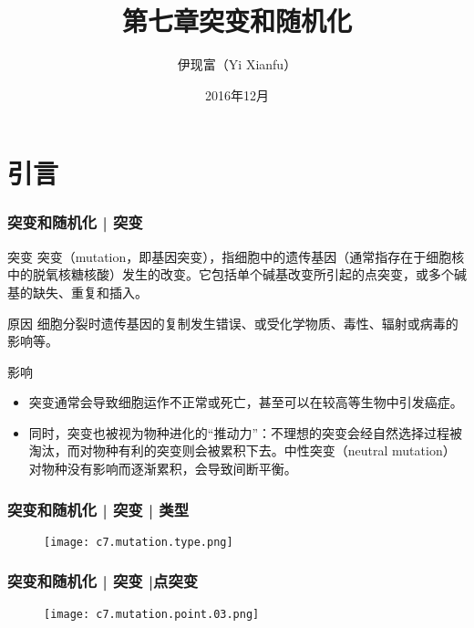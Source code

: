 


\title[突变和随机化]{第七章\quad 突变和随机化}
\author[Yixf]{伊现富（Yi Xianfu）}
\date{2016年12月}





\section{引言}
\begin{frame}
  \frametitle{突变和随机化 | 突变}
  \begin{block}{突变}
 突变（mutation，即基因突变），指细胞中的遗传基因（通常指存在于细胞核中的脱氧核糖核酸）发生的改变。它包括单个碱基改变所引起的点突变，或多个碱基的缺失、重复和插入。
  \end{block}
  \pause
  \begin{block}{原因}
    细胞分裂时遗传基因的复制发生错误、或受化学物质、毒性、辐射或病毒的影响等。
  \end{block}
  \pause
  \begin{block}{影响}
    \begin{itemize}
      \item 突变通常会导致细胞运作不正常或死亡，甚至可以在较高等生物中引发癌症。
      \item 同时，突变也被视为物种进化的“推动力”：不理想的突变会经自然选择过程被淘汰，而对物种有利的突变则会被累积下去。中性突变（neutral mutation）对物种没有影响而逐渐累积，会导致间断平衡。
    \end{itemize}
  \end{block}
\end{frame}

\begin{frame}
  \frametitle{突变和随机化 | 突变 | 类型}
  \begin{figure}
    \centering
    \texttt{[image: c7.mutation.type.png]}
  \end{figure}
\end{frame}

\begin{frame}
  \frametitle{突变和随机化 | 突变 |点突变}
  \begin{figure}
    \centering
    \texttt{[image: c7.mutation.point.03.png]}
  \end{figure}
\end{frame}

